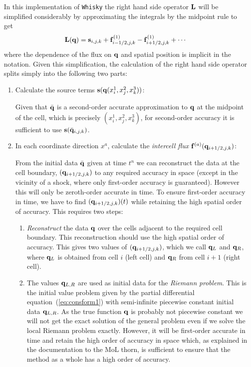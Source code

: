 \documentclass{article}
\begin{document}
In this implementation of {\tt Whisky} the right hand side operator ${\bf L}$
will be simplified considerably by approximating the integrals by the
midpoint rule to get
\begin{equation}
  \label{eq:molrhs2}
  {\bf L}({\bf q}) = {\bf s}_{i,j,k} + {\bf f}^{(1)}_{i-1/2,j,k} -
    {\bf f}^{(1)}_{i+1/2,j,k} + \cdots
\end{equation}
where the dependence of the flux on ${\bf q}$ and spatial position is
implicit in the notation. Given this simplification, the calculation
of the right hand side operator splits simply into the following two parts:
\begin{enumerate}
\item Calculate the source terms ${\bf s}({\bf q}(x^1_i, x^2_j,
  x^3_k))$:

  Given that $\bar{{\bf q}}$ is a second-order accurate approximation
  to ${\bf q}$ at the midpoint of the cell, which is precisely $(x^1_i, x^2_j,
  x^3_k)$, for second-order accuracy it is sufficient to use ${\bf
  s}(\bar{{\bf q}}_{i,j,k})$.
\item In each coordinate direction $x^a$, calculate the {\it intercell
    flux} ${\bf f}^{(a)}({\bf q}_{i+1/2,j,k})$:
  
  From the initial data $\bar{{\bf q}}$ given at time $t^n$ we can
  reconstruct the data at the cell boundary, $({\bf q}_{i+1/2,j,k})$
  to any required accuracy in space (except in the vicinity of a
  shock, where only first-order accuracy is guaranteed).
  However this will only be zeroth-order accurate
  in time. To ensure first-order accuracy in time, we have to find
  $({\bf q}_{i+1/2,j,k})(t)$ while retaining the high spatial order
  of accuracy. This requires two steps:
  \begin{enumerate}
  \item {\it Reconstruct} the data ${\bf q}$ over the cells adjacent
    to the required cell boundary. This reconstruction should use the
    high spatial order of accuracy. This gives two values of
    $({\bf q}_{i+1/2,j,k})$, which we call ${\bf q}_L$ and ${\bf q}_R$,
    where ${\bf q}_L$ is obtained from cell $i$ (left cell) and ${\bf q}_R$
    from cell $i+1$ (right cell).
  \item The values ${\bf q}_{L,R}$ are used as initial data for the
    {\it Riemann problem}. This is the initial value problem given by
    the partial differential equation~(\ref{eq:consform1}) with
    semi-infinite piecewise constant initial data ${\bf q}_{L,R}$. As
    the true function ${\bf q}$ is probably not piecewise constant we
    will not get the exact solution of the general problem even if we
    solve the local Riemann problem exactly. However, it will be first-order 
    accurate in time and retain the high order of accuracy in
    space which, as explained in the documentation to the MoL thorn,
    is sufficient to ensure that the method as a whole has a high
    order of accuracy. 
  \end{enumerate}
\end{enumerate}
\end{document}
